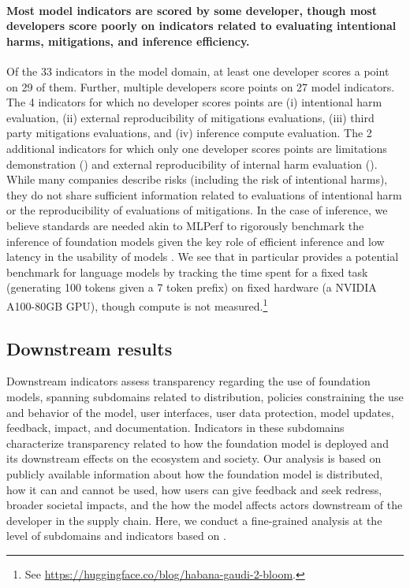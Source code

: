 \paragraph{Most model indicators are scored by some developer, though most developers score poorly on indicators related to evaluating intentional harms, mitigations, and inference efficiency.}
Of the 33 indicators in the model domain, at least one developer scores a point on 29 of them. 
Further, multiple developers score points on 27 model indicators.
The 4 indicators for which no developer scores points are (i) intentional harm evaluation, (ii) external reproducibility of mitigations evaluations, (iii) third party mitigations evaluations, and (iv) inference compute evaluation.
The 2 additional indicators for which only one developer scores points are limitations demonstration (\cohere) and external reproducibility of internal harm evaluation (\openai).
While many companies describe risks (including the risk of intentional harms), they do not share sufficient information related to evaluations of intentional harm or the reproducibility of evaluations of mitigations.
In the case of inference, we believe standards are needed akin to MLPerf \citep{reddi2020mlperf} to rigorously benchmark the inference of foundation models \citep{narayanan2023cheaply} given the key role of efficient inference and low latency in the usability of models \citep{lee2023evaluating}.
We see that \bloomz in particular provides a potential benchmark for language models by tracking the time spent for a fixed task (generating 100 tokens given a 7 token prefix) on fixed hardware (a NVIDIA A100-80GB GPU), though compute is not measured.\footnote{See \url{https://huggingface.co/blog/habana-gaudi-2-bloom}.}

\hypertarget{downstream-results}{\subsection{Downstream results}}
\label{sec:downstream-results}

Downstream indicators assess transparency regarding the use of foundation models, spanning subdomains related to distribution, policies constraining the use and behavior of the model, user interfaces, user data protection, model updates, feedback, impact, and documentation. 
Indicators in these subdomains characterize transparency related to how the foundation model is deployed and its downstream effects on the ecosystem and society. 
Our analysis is based on publicly available information about how the foundation model is distributed, how it can and cannot be used, how users can give feedback and seek redress, broader societal impacts, and the how the model affects actors downstream of the developer in the supply chain.
Here, we conduct a fine-grained analysis at the level of subdomains and indicators based on .

